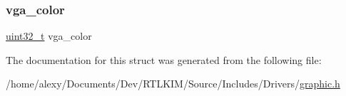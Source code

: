 \mbox{\label{structcolorscheme_a33d692e7b73597cc66a2fd249c6608c7}} 
\subsubsection{\texorpdfstring{vga\+\_\+color}{vga\_color}}
{\footnotesize\ttfamily \hyperlink{stdint_8h_a324c5d28c0d82f502a234ab99efac87a}{uint32\+\_\+t} vga\+\_\+color}



The documentation for this struct was generated from the following file\+:\begin{DoxyCompactItemize}
\item 
/home/alexy/\+Documents/\+Dev/\+R\+T\+L\+K\+I\+M/\+Source/\+Includes/\+Drivers/\hyperlink{graphic_8h}{graphic.\+h}\end{DoxyCompactItemize}
